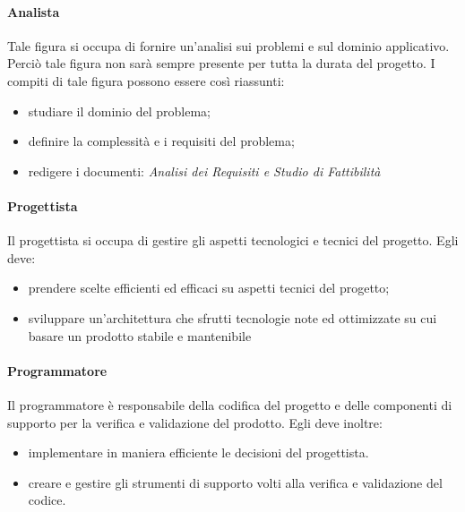 			\paragraph{Analista}
			Tale figura si occupa di fornire un'analisi sui problemi e sul dominio applicativo. Perciò tale figura non sarà sempre presente per tutta la durata del progetto.
			I compiti di tale figura possono essere così riassunti:
			\begin{itemize}
				\item studiare il dominio del problema;
				\item definire la complessità e i requisiti del problema;
				\item redigere i documenti: \textit{Analisi dei Requisiti e Studio di Fattibilità}
			\end{itemize}
		
			\paragraph{Progettista}
			Il progettista si occupa di gestire gli aspetti tecnologici e tecnici del progetto.
			Egli deve:
			\begin{itemize}
				\item prendere scelte efficienti ed efficaci su aspetti tecnici del progetto;
				\item sviluppare un'architettura che sfrutti tecnologie note ed ottimizzate su cui basare un prodotto stabile e mantenibile
			\end{itemize}
		
			\paragraph{Programmatore}
			Il programmatore è responsabile della codifica del progetto e delle componenti di supporto per la verifica e validazione del prodotto. Egli deve inoltre: 
			\begin{itemize}
				\item implementare in maniera efficiente le decisioni del progettista.
				\item creare e gestire gli strumenti di supporto volti alla verifica e validazione del codice.
			\end{itemize}
		
